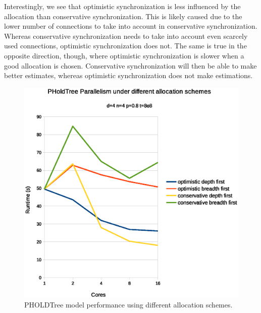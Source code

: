 Interestingly, we see that optimistic synchronization is less influenced by the allocation than conservative synchronization.
This is likely caused due to the lower number of connections to take into account in conservative synchronization.
Whereas conservative synchronization needs to take into account even scarcely used connections, optimistic synchronization does not.
The same is true in the opposite direction, though, where optimistic synchronization is slower when a good allocation is chosen.
Conservative synchronization will then be able to make better estimates, whereas optimistic synchronization does not make estimations.

\begin{figure}
    \center
    \includegraphics[width=\columnwidth]{fig/pholdtreeallochighp.eps}
    \caption{PHOLDTree model performance using different allocation schemes.}
    \label{fig:PholdTree_plot_alloc_high}
\end{figure}
